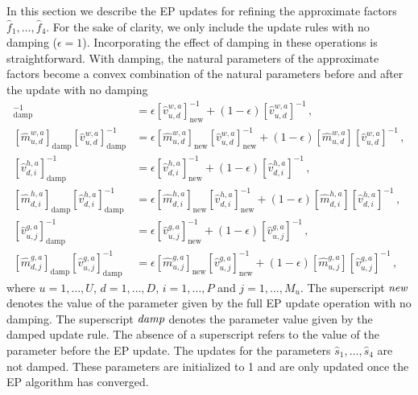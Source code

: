 In this section we describe the EP updates for refining the approximate factors $\hat{f}_1,\ldots,\hat{f}_4$.
For the sake of clarity, we only include the update rules with no damping ($\epsilon = 1$).
Incorporating the effect of damping in these operations is straightforward. 
With damping,  the natural parameters of the approximate factors become 
a convex combination of the natural parameters before and after the 
update with no damping
\begin{align}
[\hat{v}_{u,d}^{w,a}]^{-1}_\text{damp} & = \epsilon [\hat{v}_{u,d}^{w,a}]^{-1}_\text{new}
+ (1 - \epsilon) [\hat{v}_{u,d}^{w,a}]^{-1}\,,\\
[\hat{m}_{u,d}^{w,a}]_\text{damp} [\hat{v}_{u,d}^{w,a}]_\text{damp}^{-1} & =
\epsilon [\hat{m}_{u,d}^{w,a}]_\text{new} [\hat{v}_{u,d}^{w,a}]_\text{new}^{-1} + (1 - \epsilon)
[\hat{m}_{u,d}^{w,a}][\hat{v}_{u,d}^{w,a}]^{-1}\,,\\
[\hat{v}_{d,i}^{h,a}]^{-1}_\text{damp} & = \epsilon [\hat{v}_{d,i}^{h,a}]^{-1}_\text{new}
+ (1 - \epsilon) [\hat{v}_{d,i}^{h,a}]^{-1}\,,\\
[\hat{m}_{d,i}^{h,a}]_\text{damp} [\hat{v}_{d,i}^{h,a}]_\text{damp}^{-1} & =
\epsilon [\hat{m}_{d,i}^{h,a}]_\text{new} [\hat{v}_{d,i}^{h,a}]_\text{new}^{-1} + (1 - \epsilon)
[\hat{m}_{d,i}^{h,a}][\hat{v}_{d,i}^{h,a}]^{-1}\,,\\
[\hat{v}_{u,j}^{g,a}]^{-1}_\text{damp} & = \epsilon [\hat{v}_{u,j}^{g,a}]^{-1}_\text{new}
+ (1 - \epsilon) [\hat{v}_{u,j}^{g,a}]^{-1}\,,\\
[\hat{m}_{d,j}^{g,a}]_\text{damp} [\hat{v}_{u,j}^{g,a}]_\text{damp}^{-1} & =
\epsilon [\hat{m}_{u,j}^{g,a}]_\text{new} [\hat{v}_{u,j}^{g,a}]_\text{new}^{-1} + (1 - \epsilon)
[\hat{m}_{u,j}^{g,a}][\hat{v}_{u,j}^{g,a}]^{-1}\,,
\end{align}
where $u = 1,\ldots,U$, $d = 1,\ldots,D$, $i = 1,\ldots,P$ and $j=1,\ldots,M_u$.
The superscript $\emph{new}$ denotes the value of the parameter 
given by the full EP update operation with no damping.
The superscript $\emph{damp}$ denotes the parameter value given by the
damped update rule. The absence of a superscript refers to
the value of the parameter before the EP update.
The updates for the parameters $\hat{s}_1,\ldots,\hat{s}_4$ are not damped. These parameters are initialized to 1 and are only
updated once the EP algorithm has converged.

